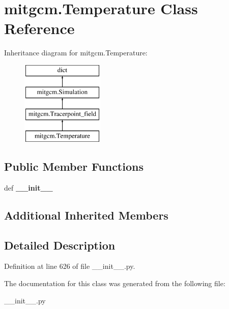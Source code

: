 \hypertarget{classmitgcm_1_1Temperature}{\section{mitgcm.\+Temperature Class Reference}
\label{classmitgcm_1_1Temperature}
}
Inheritance diagram for mitgcm.\+Temperature\+:\begin{figure}[H]
\begin{center}
\leavevmode
\includegraphics[height=4.000000cm]{classmitgcm_1_1Temperature}
\end{center}
\end{figure}
\subsection*{Public Member Functions}
\begin{DoxyCompactItemize}
\item 
\hypertarget{classmitgcm_1_1Temperature_af8a4e75bd94a1c6ab81f96ef0c4179f7}{def {\bfseries \+\_\+\+\_\+init\+\_\+\+\_\+}}\label{classmitgcm_1_1Temperature_af8a4e75bd94a1c6ab81f96ef0c4179f7}

\end{DoxyCompactItemize}
\subsection*{Additional Inherited Members}


\subsection{Detailed Description}


Definition at line 626 of file \+\_\+\+\_\+init\+\_\+\+\_\+.\+py.



The documentation for this class was generated from the following file\+:\begin{DoxyCompactItemize}
\item 
\+\_\+\+\_\+init\+\_\+\+\_\+.\+py\end{DoxyCompactItemize}
